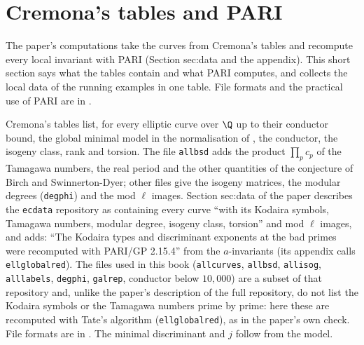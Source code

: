 \section{Cremona's tables and PARI}\label{sec:reduction:tables}

The paper's computations take the curves from Cremona's tables and recompute every local invariant with PARI (Section
sec:data and the appendix). This short section says what the tables contain and what PARI computes, and collects the local
data of the running examples in one table. File formats and the practical use of PARI are in .

\begin{remark}\label{rem:reduction:cremona-tables}
Cremona's tables \cite{Cremona97,ecdata} list, for every elliptic curve over $\Q$ up to their conductor bound, the global minimal model
in the normalisation of , the conductor, the isogeny class, rank and torsion. The file
\texttt{allbsd} adds the product $\prod_pc_p$ of the Tamagawa numbers, the real period and the other quantities of the conjecture of Birch
and Swinnerton-Dyer; other files give the isogeny matrices, the modular degrees (\texttt{degphi}) and the mod $\ell$ images. Section
sec:data of the paper describes the \texttt{ecdata} repository as containing every curve ``with its Kodaira symbols, Tamagawa
numbers, modular degree, isogeny class, torsion'' and mod $\ell$ images, and adds: ``The Kodaira types and discriminant exponents
at the bad primes were recomputed with PARI/GP 2.15.4'' from the $a$-invariants (its appendix calls \texttt{ellglobalred}). The files
used in this book (\texttt{allcurves}, \texttt{allbsd}, \texttt{allisog}, \texttt{alllabels}, \texttt{degphi}, \texttt{galrep},
conductor below $10{,}000$) are a subset of that repository and, unlike the paper's description of the full repository, do not list
the Kodaira symbols or the Tamagawa numbers prime by prime: here these are recomputed with Tate's algorithm (\texttt{ellglobalred}),
as in the paper's own check. File formats are in . The minimal discriminant and $j$ follow from the model.
\end{remark}

